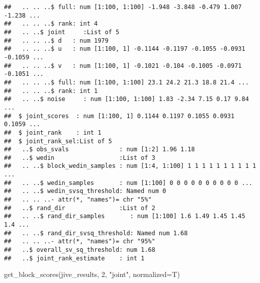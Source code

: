 \documentclass[
]{article}
\newenvironment{Shaded}{\begin{snugshade}}{\end{snugshade}}
\newcommand{\AttributeTok}[1]{\textcolor[rgb]{0.77,0.63,0.00}{#1}}
\newcommand{\DecValTok}[1]{\textcolor[rgb]{0.00,0.00,0.81}{#1}}
\newcommand{\FunctionTok}[1]{\textcolor[rgb]{0.00,0.00,0.00}{#1}}
\newcommand{\NormalTok}[1]{#1}
\newcommand{\StringTok}[1]{\textcolor[rgb]{0.31,0.60,0.02}{#1}}
\begin{document}
\begin{verbatim}
##   .. .. ..$ full: num [1:100, 1:100] -1.948 -3.848 -0.479 1.007 -1.238 ...
##   .. .. ..$ rank: int 4
##   .. ..$ joint     :List of 5
##   .. .. ..$ d   : num 1979
##   .. .. ..$ u   : num [1:100, 1] -0.1144 -0.1197 -0.1055 -0.0931 -0.1059 ...
##   .. .. ..$ v   : num [1:100, 1] -0.1021 -0.104 -0.1005 -0.0971 -0.1051 ...
##   .. .. ..$ full: num [1:100, 1:100] 23.1 24.2 21.3 18.8 21.4 ...
##   .. .. ..$ rank: int 1
##   .. ..$ noise     : num [1:100, 1:100] 1.83 -2.34 7.15 0.17 9.84 ...
##  $ joint_scores  : num [1:100, 1] 0.1144 0.1197 0.1055 0.0931 0.1059 ...
##  $ joint_rank    : int 1
##  $ joint_rank_sel:List of 5
##   ..$ obs_svals              : num [1:2] 1.96 1.18
##   ..$ wedin                  :List of 3
##   .. ..$ block_wedin_samples : num [1:4, 1:100] 1 1 1 1 1 1 1 1 1 1 ...
##   .. ..$ wedin_samples       : num [1:100] 0 0 0 0 0 0 0 0 0 0 ...
##   .. ..$ wedin_svsq_threshold: Named num 0
##   .. .. ..- attr(*, "names")= chr "5%"
##   ..$ rand_dir               :List of 2
##   .. ..$ rand_dir_samples       : num [1:100] 1.6 1.49 1.45 1.45 1.4 ...
##   .. ..$ rand_dir_svsq_threshold: Named num 1.68
##   .. .. ..- attr(*, "names")= chr "95%"
##   ..$ overall_sv_sq_threshold: num 1.68
##   ..$ joint_rank_estimate    : int 1
\end{verbatim}

\begin{Shaded}
\begin{Highlighting}[]
\FunctionTok{get\_block\_scores}\NormalTok{(jive\_results, }\DecValTok{2}\NormalTok{, }\StringTok{"joint"}\NormalTok{, }\AttributeTok{normalized=}\NormalTok{T)}
\end{Highlighting}
\end{Shaded}
\end{document}
